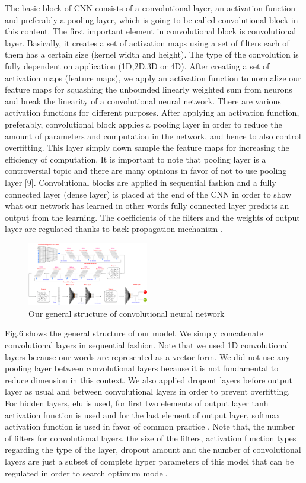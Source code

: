 \documentclass[10pt,conference,compsocconf]{IEEEtran}
\begin{document}
The basic block of CNN consists of a convolutional layer, an activation function and preferably a pooling layer, which is going to be called convolutional block in this content. The first important element in convolutional block is convolutional layer. Basically, it creates a set of activation maps using a set of filters each of them has a certain size (kernel width and height). The type of the convolution is fully dependent on application (1D,2D,3D or 4D). After creating a set of activation maps (feature maps), we apply an activation function to normalize our feature maps for squashing the unbounded linearly weighted sum from neurons and break the linearity of a convolutional neural network. There are various activation functions for different purposes. After applying an activation function, preferably, convolutional block applies a pooling layer in order to reduce the amount of parameters and computation in the network, and hence to also control overfitting. This layer simply down sample the feature maps for increasing the efficiency of computation. It is important to note that pooling layer is a controversial topic and there are many opinions in favor of not to use pooling layer [9]. Convolutional blocks are applied in sequential fashion and a fully connected layer (dense layer) is placed at the end of the CNN in order to show what our network has learned in other words fully connected layer predicts an output from the learning. The coefficients of the filters and the weights of output layer are regulated thanks to back propagation mechanism \cite{cnn1}  \cite{cnn3} \cite{cnn4}.
\begin{figure}[!htb]
	\centering \includegraphics[width=200px]{../plots/cnn}
	\caption{Our general structure of convolutional neural network}
	\label{fig:data}
\end{figure}

Fig.6 shows the general structure of our model. We simply concatenate convolutional layers in sequential fashion. Note that we used 1D convolutional layers because our words are represented as a vector form. We did not use any pooling layer between convolutional layers because it is not fundamental to reduce dimension in this context. We also applied dropout layers before output layer as usual and between convolutional layers \cite{cnn5}in order to prevent overfitting. For hidden layers, elu is used, for first two elements of output layer tanh activation function is used and for the last element of output layer, softmax activation function is used in favor of common practice \cite{cnn6}.
Note that, the number of filters for convolutional layers, the size of the filters, activation function types regarding the type of the layer, dropout amount and the number of convolutional layers are just a subset of complete hyper parameters of this model that can be regulated in order to search optimum model.
\end{document}
